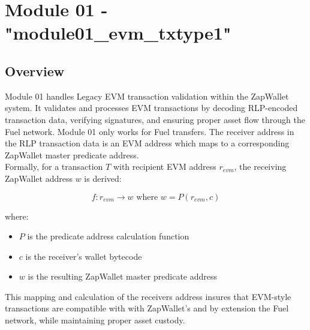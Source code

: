 \newpage
\section{Module 01 - {\ttfamily "module01\_evm\_txtype1"}}
\label{sec:module01_predicate}



\subsection{Overview}
Module 01 handles Legacy EVM transaction validation within the ZapWallet system. It validates and processes EVM transactions
by decoding RLP-encoded transaction data, verifying signatures, and ensuring proper asset flow through the Fuel network. Module 01
only works for Fuel  transfers. The receiver address in the RLP transaction data is an EVM address which maps
to a corresponding ZapWallet master predicate address. \\

Formally, for a transaction $T$ with recipient EVM address $r_{evm}$, the receiving ZapWallet address $w$ is derived:

\[ f: r_{evm} \rightarrow w \text{ where } w = P(r_{evm}, c) \]

where:
\begin{itemize}
   \item $P$ is the predicate address calculation function
   \item $c$ is the receiver's wallet bytecode
   \item $w$ is the resulting ZapWallet master predicate address
\end{itemize}

This mapping and calculation of the receivers address insures that EVM-style transactions are compatible with with ZapWallet's and
by extension the Fuel network, while maintaining proper asset custody.



